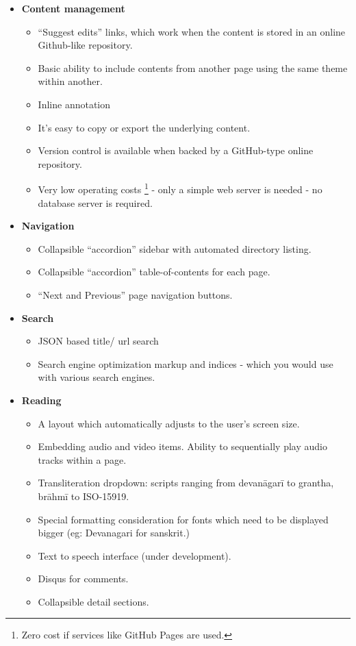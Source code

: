 \documentclass[11pt]{article}
\begin{document}
\begin{itemize}
\tightlist
\item
  \textbf{Content management}

  \begin{itemize}
  \tightlist
  \item
    ``Suggest edits'' links, which work when the content is stored in an online Github-like repository.
  \item
    Basic ability to include contents from another page using the same
    theme within another.
  \item
    Inline annotation
  \item
    It's easy to copy or export the underlying content.
  \item
    Version control is available when backed by a GitHub-type online repository.
  \item
    Very low operating costs \footnote{Zero cost if services like GitHub Pages are used.} - only a simple web server is needed - no database server is required.
  \end{itemize}
\item
  \textbf{Navigation}

  \begin{itemize}
  \tightlist
  \item
    Collapsible ``accordion'' sidebar with automated directory listing.
  \item
    Collapsible ``accordion'' table-of-contents for each page.
  \item
    ``Next and Previous'' page navigation buttons.
  \end{itemize}
\item
  \textbf{Search}

  \begin{itemize}
  \tightlist
  \item
    JSON based title/ url search
  \item
    Search engine optimization markup and indices - which you would use
    with various search engines.
  \end{itemize}
\item
  \textbf{Reading}

  \begin{itemize}
  \tightlist
  \item
    A layout which automatically adjusts to the user's screen size.
  \item
    Embedding audio and video items. Ability to sequentially play audio
    tracks within a page.
  \item
    Transliteration dropdown: scripts ranging from devanāgarī to
    grantha, brāhmī to ISO-15919.
  \item
    Special formatting consideration for fonts which need to be
    displayed bigger (eg: Devanagari for sanskrit.)
  \item
    Text to speech interface (under development).
  \item
    Disqus for comments.
  \item
    Collapsible detail sections.
  \end{itemize}
\end{itemize}
\end{document}

